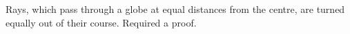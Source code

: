 Rays, which pass through a globe
at equal distances from the centre,
are turned equally out of their course. 
Required a proof.
